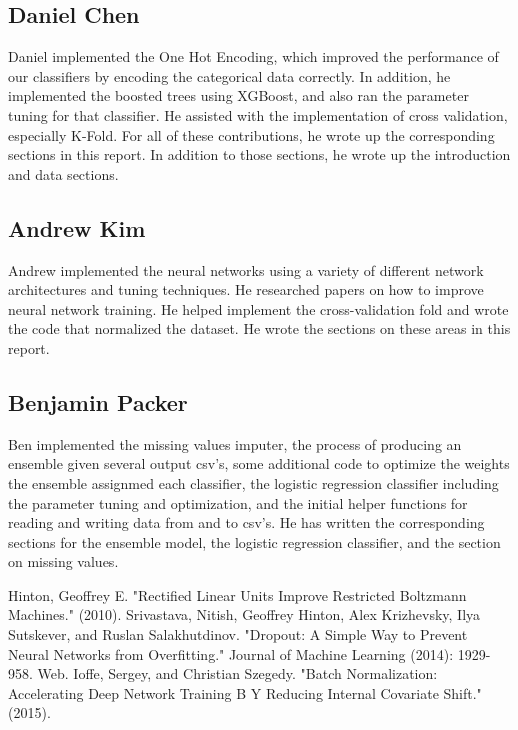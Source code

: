 \documentclass[twoside,11pt]{article}
\theoremstyle{definition}
\begin{document}
  \subsection{Daniel Chen}
    Daniel implemented the One Hot Encoding, which improved the performance of our classifiers by encoding the categorical data correctly. In addition, he implemented the boosted trees using XGBoost, and also ran the parameter tuning for that classifier. He assisted with the implementation of cross validation, especially K-Fold. For all of these contributions, he wrote up the corresponding sections in this report. In addition to those sections, he wrote up the introduction and data sections.

  \subsection{Andrew Kim}
    Andrew implemented the neural networks using a variety of different network architectures and tuning techniques. He researched papers on how to improve neural network training. He helped implement the cross-validation fold and wrote the code that normalized the dataset. He wrote the sections on these areas in this report. 

  \subsection{Benjamin Packer}
    Ben implemented the missing values imputer, the process of producing an ensemble given several output csv's, some additional code to optimize the weights the ensemble assignmed each classifier, the logistic regression classifier including the parameter tuning and optimization, and the initial helper functions for reading and writing data from and to csv's. He has written the corresponding sections for the ensemble model, the logistic regression classifier, and the section on missing values.

\begin{thebibliography}{1}
    Hinton, Geoffrey E. "Rectified Linear Units Improve Restricted Boltzmann Machines." (2010). 
    Srivastava, Nitish, Geoffrey Hinton, Alex Krizhevsky, Ilya Sutskever, and Ruslan Salakhutdinov. "Dropout: A Simple Way to Prevent Neural Networks from Overfitting." Journal of Machine Learning (2014): 1929-958. Web. 
    Ioffe, Sergey, and Christian Szegedy. "Batch Normalization: Accelerating Deep Network Training B Y Reducing Internal Covariate Shift." (2015).
\end{thebibliography}
\end{document}
